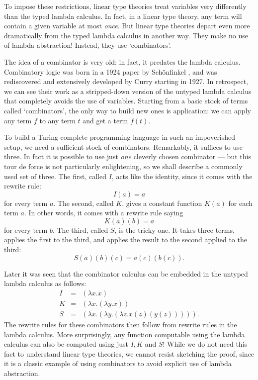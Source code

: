 \documentclass[12pt,twoside,openright]{report}
\begin{document}
To impose these restrictions, linear type theories treat variables very differently than the typed lambda calculus.  In fact, in a linear type theory, any term will contain a given variable at most {\it once}.  But linear type theories depart even more dramatically from the typed lambda calculus in another way.  They make no use of lambda abstraction!  Instead, they use `combinators'.

The idea of a combinator is very old: in fact, it predates the lambda calculus.  Combinatory logic was born in a 1924 paper by Sch\"onfinkel
\cite{Schoenfinkel}, and was rediscovered and extensively developed by Curry \cite{Curry} starting in 1927.  In retrospect, we can see their work as a stripped-down version of the untyped lambda calculus that completely avoids the use of variables.  Starting from a basic stock of terms called `combinators', the only way to build new ones is application: we can apply any term $f$ to any term $t$ and get a term
$f(t)$.

To build a Turing-complete programming language in such an impoverished setup, we need a sufficient stock of combinators.  Remarkably, it suffices to use three.  In fact it is possible to use just {\it one}
cleverly chosen combinator --- but this tour de force is not particularly enlightening, so we shall describe a commonly used set of three.  The first, called $I$, acts like the identity, since it comes with the rewrite rule:
\[     I(a) = a  \]
for every term $a$.  The second, called $K$, gives a constant function
$K(a)$ for each term $a$.  In other words, it comes with a rewrite rule saying
\[   K(a)(b) = a  \]
for every term $b$.  The third, called $S$, is the tricky one.  It takes three terms, applies the first to the third, and applies the result to the second applied to the third:
\[   S(a)(b)(c) = a(c)(b(c)).  \]

Later it was seen that the combinator calculus can be embedded in the untyped lambda calculus as follows:
\[
\begin{array}{ccl}
  I &=& (\lambda x . x)  \\
  K &=& (\lambda x . (\lambda y . x)) \\
  S &=& (\lambda x . (\lambda y . (\lambda z . x(z)(y(z)) ))) .
\end{array}
\]
The rewrite rules for these combinators then follow from rewrite rules in the lambda calculus.  More surprisingly, any function computable using the lambda calculus can also be computed using just $I, K$ and
$S$!  While we do not need this fact to understand linear type theories, we cannot resist sketching the proof, since it is a classic example of using combinators to avoid explicit use of lambda abstraction.
\end{document}
